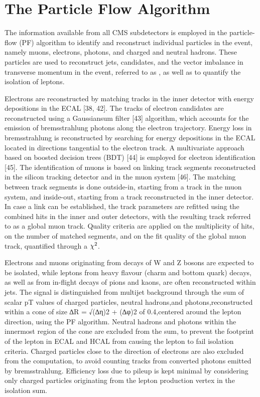 \section{The Particle Flow Algorithm}


The information available from all CMS subdetectors is employed in the particle-ﬂow (PF) algorithm \cite{CMS:2009nxa,CMS:2010byl} to identify and reconstruct individual particles in the event, namely muons, electrons, photons, and charged and neutral hadrons. These particles are used to reconstruct jets, \hadtau candidates, and the vector imbalance in transverse momentum in the event, referred to as \ptvecmiss, as well as to quantify the isolation of leptons. 

Electrons are reconstructed by matching tracks in the inner detector with energy depositions in the ECAL [38, 42]. The tracks of electron candidates are reconstructed using a Gaussiansum ﬁlter [43] algorithm, which accounts for the emission of bremsstrahlung photons along the electron trajectory. Energy loss in bremsstrahlung is reconstructed by searching for energy depositions in the ECAL located in directions tangential to the electron track. A multivariate approach based on boosted decision trees (BDT) [44] is employed for electron identiﬁcation [45]. The identiﬁcation of muons is based on linking track segments reconstructed in the silicon tracking detector and in the muon system [46]. The matching between track segments is done outside-in, starting from a track in the muon system, and inside-out, starting from a track reconstructed in the inner detector. In case a link can be established, the track parameters are refitted using the combined hits in the inner and outer detectors, with the resulting track referred to as a global muon track. Quality criteria are applied on the multiplicity of hits, on the number of matched segments, and on the ﬁt quality of the global muon track, quantified through a \ensuremath{\chisquare}.

Electrons and muons originating from decays of W and Z bosons are expected to be isolated, while leptons from heavy ﬂavour (charm and bottom quark) decays, as well as from in-ﬂight decays of pions and kaons, are often reconstructed within jets. The signal is distinguished from multijet background through the sum of scalar pT values of charged particles, neutral hadrons,and photons,reconstructed within a cone of size ∆R = √(∆η)2 + (∆φ)2 of 0.4,centered around the lepton direction, using the PF algorithm. Neutral hadrons and photons within the innermost region of the cone are excluded from the sum, to prevent the footprint of the lepton in ECAL and HCAL from causing the lepton to fail isolation criteria. Charged particles close to the direction of electrons are also excluded from the computation, to avoid counting tracks from converted photons emitted by bremsstrahlung. Efficiency loss due to pileup is kept minimal by considering only charged particles originating from the lepton production vertex in the isolation sum. 

